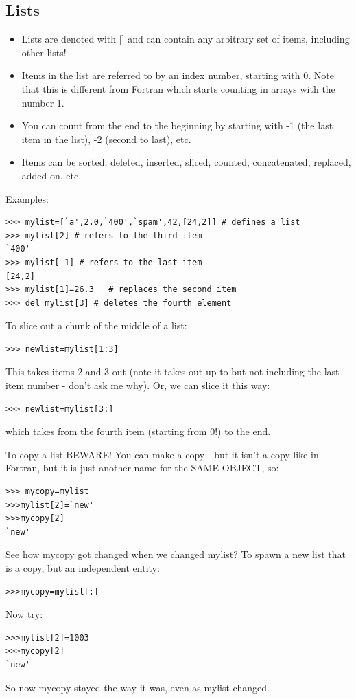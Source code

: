 \documentclass[11pt]{book}
\begin{document}
\subsection{Lists}
\begin{itemize}
\item Lists are denoted with []  and can contain any arbitrary set of items, including other lists!
\item Items in the list are referred to by an index number, starting with 0.  Note that this is different from Fortran which starts counting in arrays with the number 1.
\item You can  count from the end to the beginning by starting with -1 (the last item in the list), -2 (second to last), etc. 
\item Items can be sorted, deleted, inserted, sliced, counted, concatenated, replaced, added on, etc.
\end{itemize}
\noindent
Examples:

{ \color{blue} \begin{verbatim}
>>> mylist=[`a',2.0,`400',`spam',42,[24,2]] # defines a list
>>> mylist[2] # refers to the third item
`400'
>>> mylist[-1] # refers to the last item
[24,2]
>>> mylist[1]=26.3   # replaces the second item
>>> del mylist[3] # deletes the fourth element 
\end{verbatim}}


\noindent
To slice out a chunk of the middle of a list:
{ \color{blue} \begin{verbatim}
>>> newlist=mylist[1:3]
\end{verbatim}}
\noindent
This takes items 2 and 3 out (note it takes out up to but not including the last item number - don't ask me why).  
Or, we can slice it this way:
{ \color{blue} \begin{verbatim}
>>> newlist=mylist[3:] 
\end{verbatim}}
\noindent
which takes from the fourth item (starting from 0!) to the end. 


To copy a list BEWARE! You can make  a copy - but it isn't a copy like in Fortran, but it is just another name for the SAME OBJECT, so:
{ \color{blue} \begin{verbatim}
>>> mycopy=mylist
>>>mylist[2]=`new'
>>>mycopy[2]
`new'
\end{verbatim}}
\noindent
See how mycopy got changed when we changed mylist?
\noindent
To spawn a new list that is a copy, but an independent entity:
{ \color{blue} \begin{verbatim}
>>>mycopy=mylist[:]
\end{verbatim}}
\noindent
Now try:
{ \color{blue} \begin{verbatim}
>>>mylist[2]=1003
>>>mycopy[2]
`new'
\end{verbatim}}
\noindent
So now {\color{blue}mycopy}  stayed the way it was, even as {\color{blue}mylist } changed.  
\end{document}
